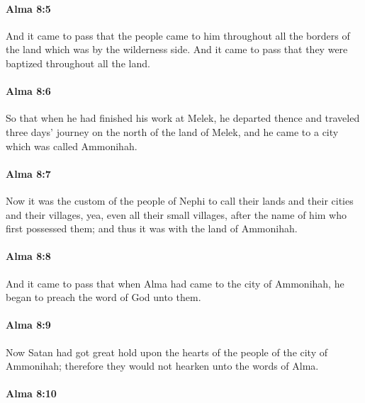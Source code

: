 		\paragraph{Alma 8:5} %
			\label{ALMA-8-5}

			And it came to pass that the people came to him
			throughout all the borders of the land which was by the wilderness side.
			And it came to pass that they were baptized throughout all the land.

		\paragraph{Alma 8:6} %
			\label{ALMA-8-6}

			So that when he had finished his work at Melek,
			he departed thence and traveled three days' journey
			on the north of the land of Melek,
			and he came to a city which was called Ammonihah.

		\paragraph{Alma 8:7} %
			\label{ALMA-8-7}

			Now it was the custom of the people of Nephi
			to call their lands and their cities and their villages,
			yea, even all their small villages,
			after the name of him who first possessed them;
			and thus it was with the land of Ammonihah.

		\paragraph{Alma 8:8} %
			\label{ALMA-8-8}

			And it came to pass that when Alma had came to the city of Ammonihah,
			he began to preach the word of God unto them.

		\paragraph{Alma 8:9} %
			\label{ALMA-8-9}

			Now Satan had got great hold
			upon the hearts of the people of the city of Ammonihah;
			therefore they would not hearken unto the words of Alma.

		\paragraph{Alma 8:10} %
			\label{ALMA-8-10}

